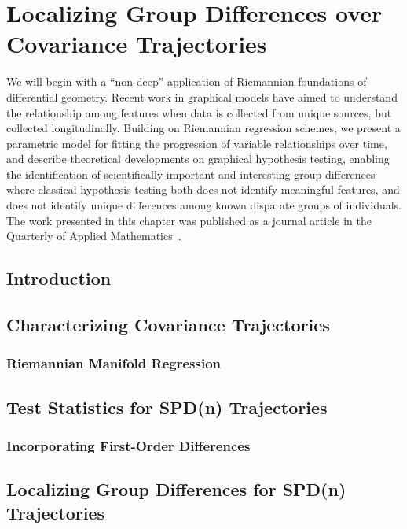 \chapter{Localizing Group Differences over
Covariance Trajectories}\label{chap:covtraj}

We will begin with a ``non-deep'' application of Riemannian foundations of differential geometry.
Recent work in graphical models have aimed
to understand the relationship among
features when data is collected from
unique sources, but collected longitudinally.
Building on Riemannian regression schemes,
we present a parametric model for fitting
the progression of variable relationships over time,
and describe theoretical developments
on graphical hypothesis testing,
enabling the identification of 
scientifically important and interesting 
group differences
where classical hypothesis testing
both does not identify meaningful features,
and does not identify unique differences
among known disparate groups of individuals.
The work presented in this chapter was published as a journal article in the Quarterly of Applied Mathematics~\citep{covtraj}.


\section{Introduction}

\section{Characterizing Covariance Trajectories}
\label{sec:mglm}

\subsection{Riemannian Manifold Regression}

\section{Test Statistics for SPD(n) Trajectories}
\label{sec:hyp-test}

\subsection{Incorporating First-Order Differences}

\section{Localizing Group Differences for SPD(n) Trajectories}
\label{sec:loc}


